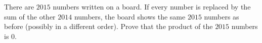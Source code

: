 There are $2015$ numbers written on a board. If every number is replaced by the sum of the other $2014$ numbers, the board shows the same $2015$ numbers as before (possibly in a different order). Prove that the product of the $2015$ numbers is $0$.
